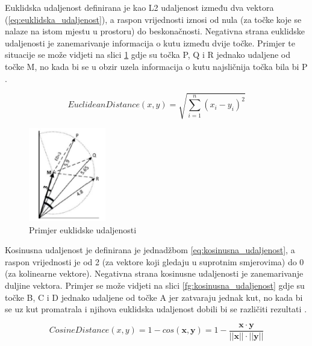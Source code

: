 \documentclass[times, utf8, proizvoljni, numeric]{fer}
\begin{document}
Euklidska udaljenost definirana je kao L2 udaljenost između dva vektora (\ref{eq:euklidska_udaljenost}), a raspon vrijednosti iznosi od nula (za točke koje se nalaze na istom mjestu u prostoru) do beskonačnosti. Negativna strana euklidske udaljenosti je zanemarivanje informacija o kutu između dvije točke. Primjer te situacije se može vidjeti na slici \ref{fg:euklidska_udaljenost} gdje su točka P, Q i R jednako udaljene od točke M, no kada bi se u obzir uzela informacija o kutu najsličnija točka bila bi P \cite{VectorSimilarity}.

\begin{equation}
\label{eq:euklidska_udaljenost}
EuclideanDistance(x,y) = \sqrt{\sum_{i=1}^n (x_i-y_i)^2}    
\end{equation}

\begin{figure}[!ht]
	\begin{center}
		\captionsetup{justification=centering}
		\includegraphics[width=0.3\textwidth]{./imgs/euklidska_udaljenost.png}
		\caption{Primjer euklidske udaljenosti \cite{VectorSimilarity}}
		\label{fg:euklidska_udaljenost}
	\end{center}
\end{figure}

Kosinusna udaljenost je definirana je jednadžbom \ref{eq:kosinusna_udaljenost}, a raspon vrijednosti je od 2 (za vektore koji gledaju u suprotnim smjerovima) do 0 (za kolinearne vektore). Negativna strana kosinusne udaljenosti je zanemarivanje duljine vektora. Primjer se može vidjeti na slici \ref{fg:kosinusna_udaljenost} gdje su točke B, C i D jednako udaljene od točke A jer zatvaraju jednak kut, no kada bi se uz kut promatrala i njihova euklidska udaljenost dobili bi se različiti rezultati \cite{VectorSimilarity}.

\begin{equation}
\label{eq:kosinusna_udaljenost}
CosineDistance(x,y) = 1- cos(\pmb x, \pmb y) = 1 - \frac {\pmb x \cdot \pmb y}{||\pmb x|| \cdot ||\pmb y||}
\end{equation}
\end{document}
